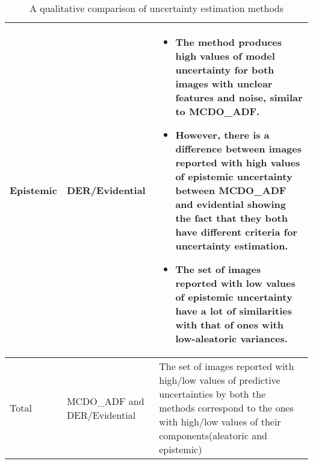 \begin{table}[h]
\begin{tabular}[h]{|p{1.5cm}|p{2.3cm}|p{13.5cm}|}
\hline
Epistemic&DER/Evidential&\begin{itemize}\item The method produces high values of model uncertainty for both images with unclear features and noise, similar to MCDO\_ADF.\item However, there is a difference between images reported with high values of epistemic uncertainty between MCDO\_ADF and evidential showing the fact that they both have different criteria for uncertainty estimation.\item The set of images reported with low values of epistemic uncertainty have a lot of similarities with that of ones with low-aleatoric variances.\end{itemize}\\
\hline
Total& MCDO\_ADF and DER/Evidential& The set of images reported with high/low values of predictive uncertainties by both the methods correspond to the ones with high/low values of their components(aleatoric and epistemic)\\
\hline
\end{tabular}
\caption{A qualitative comparison of uncertainty estimation methods}
\label{tab_qualit_compare}
\end{table}


